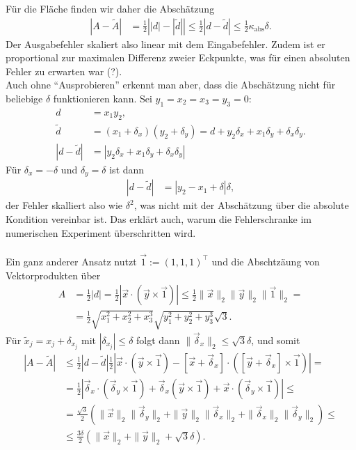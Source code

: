 \documentclass[english, parskip=full]{scrartcl}
\newcommand{\kla}{}
\newcommand{\tecxt}{}
\begin{document}
Für die Fläche finden wir daher die Abschätzung
\begin{align}
|A - \tilde{A}| &= \frac{1}{2}\left\vert |d| - |\tilde{d}| \right\vert \le \frac{1}{2}|d - \tilde{d}| \le \frac{1}{2}\kappa_\tecxt\text{abs}\delta.
\end{align}
Der Ausgabefehler skaliert also linear mit dem Eingabefehler.
Zudem ist er proportional zur maximalen Differenz zweier Eckpunkte, was für einen absoluten Fehler zu erwarten war (?).
\\
Auch ohne ``Ausprobieren'' erkennt man aber, dass die Abschätzung nicht für beliebige $\delta$ funktionieren kann.
Sei $y_1=x_2=x_3=y_3=0$:
\begin{align}
d &= x_1y_2,\\
\tilde{d} &= \kla\left( x_1 + \delta_x \right) \kla\left( y_2 + \delta_y \right) = d + y_2\delta_x + x_1\delta_y + \delta_x\delta_y.\\
|d-\tilde{d}| &= |y_2\delta_x + x_1\delta_y + \delta_x\delta_y| %
\end{align}
Für $\delta_x=-\delta$ und $\delta_y=\delta$ ist dann
\begin{align}
|d-\tilde{d}| &= |y_2-x_1 + \delta|\delta,
\end{align}
der Fehler skalliert also wie $\delta^2$, was nicht mit der Abschätzung über die absolute Kondition vereinbar ist.  
Das erklärt auch, warum die Fehlerschranke im numerischen Experiment überschritten wird.
\\ \\
Ein ganz anderer Ansatz nutzt $\vec{1} := (1,1,1)^\top$ und die Abschtzäung von Vektorprodukten über
\begin{align}
A &= \frac{1}{2}|d| = \frac{1}{2} \left\vert \vec{x}\cdot \kla\left( {\vec{y}\times \vec{1}} \right)  \right\vert \le  \frac{1}{2} \|\vec{x}\|_2 \|\vec{y}\|_2 \|\vec{1}\|_2 = \\
&= \frac{1}{2} \sqrt{x_1^2 + x_2^2 + x_3^3} \sqrt{y_1^2 + y_2^2 + y_3^3} \sqrt{3}.
\end{align}
Für $\tilde{x}_j = x_j + \delta_{x_j}$ mit $|\delta_{x_j}| \le \delta$ folgt dann $\|\vec{\delta}_x\|_2 \le \sqrt{3} \delta$, und somit
\begin{align}
|A-\tilde{A}| &\le \frac{1}{2}|d - \tilde{d}|  \frac{1}{2} \left\vert \vec{x}\cdot \kla\left( {\vec{y}\times \vec{1}} \right) -  [\vec{x} + \vec{\delta}_x ]\cdot \kla\left( {[\vec{y} + \vec{\delta}_x]\times \vec{1}} \right) \right\vert = \\
&= \frac{1}{2} \left\vert \vec{\delta}_x\cdot \kla\left( {\vec{\delta}_y\times\vec{1}} \right) + \vec{\delta}_x\kla\left( { \vec{y} \times\vec{1}} \right) + \vec{x}\cdot\kla\left( {\vec{\delta}_y \times\vec{1}} \right) \right\vert \le \\
&=\frac{\sqrt{3}}{2} \kla\left( {\|\vec{x}\|_2 \|\vec{\delta}_y\|_2 + \|\vec{y}\|_2 \|\vec{\delta}_x\|_2 + \|\vec{\delta}_x\|_2 \|\vec{\delta}_y\|_2}  \right) \le \\
&\le \frac{3\delta}{2} \kla\left( {\|\vec{x}\|_2 + \|\vec{y}\|_2 + \sqrt{3}\delta} \right).
\end{align}
\end{document}
